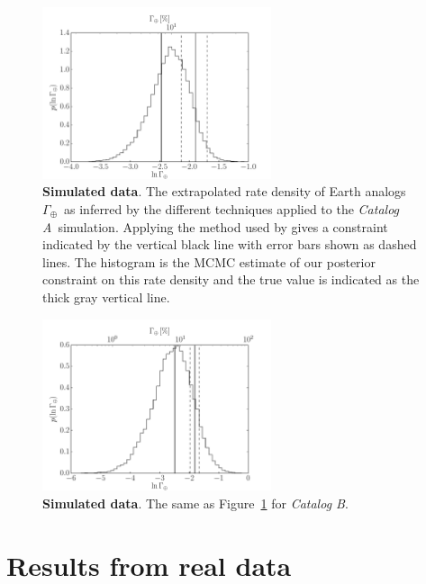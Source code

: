 \documentclass[12pt,preprint]{aastex}
\newcommand{\figref}[1]{\ref{fig:#1}}
\newcommand{\Fig}[1]{Figure~\figref{#1}}
\newcommand{\fig}[1]{\Fig{#1}}
\newcommand{\figlabel}[1]{\label{fig:#1}}
\newcommand{\rate}{\ensuremath{\Gamma}}
\newcommand{\modela}{\emph{Catalog A}}
\newcommand{\modelb}{\emph{Catalog B}}
\newcommand{\gammaearth}{{\ensuremath{\rate_\oplus}}}
\begin{document}
\begin{figure}[p]
\begin{center}
\includegraphics[width=0.6\textwidth]{figures/smooth/rate.pdf}
\end{center}
\caption{%
{\bf Simulated data}.
The extrapolated rate density of Earth analogs \gammaearth\ as inferred by the
different techniques applied to the \modela\ simulation.
Applying the method used by \citet{petigura} gives a constraint indicated by
the vertical black line with error bars shown as dashed lines.
The histogram is the MCMC estimate of our posterior constraint on this rate
density and the true value is indicated as the thick gray vertical line.
\figlabel{smooth-rate}}
\end{figure}

\begin{figure}[p]
\begin{center}
\includegraphics[width=0.6\textwidth]{figures/simulation/rate.pdf}
\end{center}
\caption{%
{\bf Simulated data}.
The same as \fig{smooth-rate} for \modelb.
\figlabel{simulation-rate}}
\end{figure}

\section{Results from real data}
\end{document}
